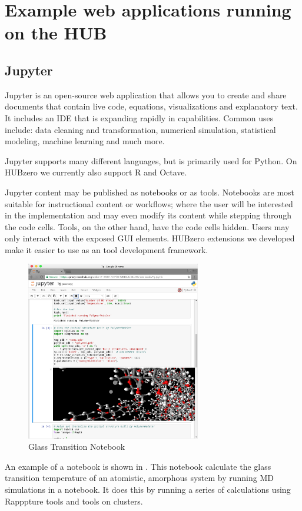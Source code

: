 \documentclass[conference]{../sty/IEEEtran}
\begin{document}
\section {Example web applications running on the HUB}

\subsection {Jupyter}
Jupyter is an open-source web application that allows you to create and share documents that contain live code, equations, visualizations and explanatory text. It includes an IDE that is expanding rapidly in capabilities. Common uses include: data cleaning and transformation, numerical simulation, statistical modeling, machine learning and much more. 

Jupyter supports many different languages, but is primarily used for Python.  On HUBzero we currently also support R and Octave.  

Jupyter content may be published as notebooks or as tools.  Notebooks are most suitable for instructional content or workflows; where the user will be interested in the implementation and may even modify its content while stepping through the code cells.  Tools, on the other hand, have the code cells hidden.  Users may only interact with the exposed GUI elements. HUBzero extensions we developed make it easier to use as an tool development framework.


\begin{figure}[!h]
	\includegraphics[width=3in]{tgnb}
	\caption{Glass Transition Notebook \cite{tg}}
	\label{fig_tg}
\end{figure}

An example of a notebook is shown in .  This notebook calculate the glass transition temperature of an atomistic, amorphous system by running MD simulations in a notebook.  It does this by running a series of calculations using Rapppture tools and tools on clusters.
\end{document}
